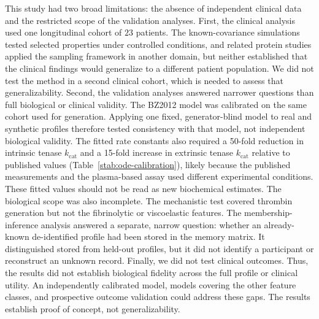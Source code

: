 This study had two broad limitations: the absence of independent clinical data and the
restricted scope of the validation analyses. First, the clinical analysis used one
longitudinal cohort of $23$ patients. The known-covariance simulations tested selected
properties under controlled conditions, and related protein studies applied the sampling
framework in another domain, but neither established that the clinical findings would
generalize to a different patient population. We did not test the method in a second clinical
cohort, which is needed to assess that generalizability. Second, the validation analyses
answered narrower questions than full biological or clinical validity. The BZ2012
model was calibrated on the same cohort used for generation. Applying one fixed,
generator-blind model to real and synthetic profiles therefore tested consistency with that
model, not independent biological validity.
The fitted rate constants also required a 50-fold reduction in intrinsic tenase
$k_{\text{cat}}$ and a 15-fold
increase in extrinsic tenase $k_{\text{cat}}$ relative to published values
(Table~\ref{stab:ode-calibration}), likely because the published measurements and the
plasma-based assay used different experimental conditions. These fitted values should not be
read as new biochemical estimates. The biological scope was also incomplete. The
mechanistic test covered thrombin generation but not the fibrinolytic or viscoelastic
features. The membership-inference analysis answered a separate, narrow question: whether an
already-known de-identified profile had been stored in the memory matrix. It distinguished
stored from held-out profiles, but it did not identify a participant or reconstruct an
unknown record. Finally, we did not test clinical outcomes. Thus, the results
did not establish biological fidelity across the full profile or clinical utility. An
independently calibrated model, models covering the other feature classes, and prospective
outcome validation could address these gaps. The results establish proof of concept, not
generalizability.
